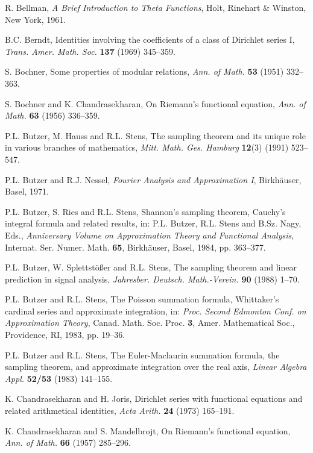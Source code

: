 \documentclass[11pt]{article}
\theoremstyle{plain}
\begin{document}
\begin{thebibliography}{99}

R. Bellman, \textit{A Brief Introduction to Theta Functions}, Holt, Rinehart \& Winston, New York, 1961.

B.C. Berndt, Identities involving the coefficients of a class of Dirichlet series I, \textit{Trans. Amer. Math. Soc.} \textbf{137} (1969) 345--359.

S. Bochner, Some properties of modular relations, \textit{Ann. of Math.} \textbf{53} (1951) 332--363.

S. Bochner and K. Chandrasekharan, On Riemann's functional equation, \textit{Ann. of Math.} \textbf{63} (1956) 336--359.

P.L. Butzer, M. Hauss and R.L. Stens, The sampling theorem and its unique role in various branches of mathematics, \textit{Mitt. Math. Ges. Hamburg} \textbf{12}(3) (1991) 523--547.

P.L. Butzer and R.J. Nessel, \textit{Fourier Analysis and Approximation I}, Birkhäuser, Basel, 1971.

P.L. Butzer, S. Ries and R.L. Stens, Shannon's sampling theorem, Cauchy's integral formula and related results, in: P.L. Butzer, R.L. Stens and B.Sz. Nagy, Eds., \textit{Anniversary Volume on Approximation Theory and Functional Analysis}, Internat. Ser. Numer. Math. \textbf{65}, Birkhäuser, Basel, 1984, pp. 363--377.

P.L. Butzer, W. Splettstößer and R.L. Stens, The sampling theorem and linear prediction in signal analysis, \textit{Jahresber. Deutsch. Math.-Verein.} \textbf{90} (1988) 1--70.

P.L. Butzer and R.L. Stens, The Poisson summation formula, Whittaker's cardinal series and approximate integration, in: \textit{Proc. Second Edmonton Conf. on Approximation Theory}, Canad. Math. Soc. Proc. \textbf{3}, Amer. Mathematical Soc., Providence, RI, 1983, pp. 19--36.

P.L. Butzer and R.L. Stens, The Euler-Maclaurin summation formula, the sampling theorem, and approximate integration over the real axis, \textit{Linear Algebra Appl.} \textbf{52/53} (1983) 141--155.

K. Chandrasekharan and H. Joris, Dirichlet series with functional equations and related arithmetical identities, \textit{Acta Arith.} \textbf{24} (1973) 165--191.

K. Chandrasekharan and S. Mandelbrojt, On Riemann's functional equation, \textit{Ann. of Math.} \textbf{66} (1957) 285--296.


\end{thebibliography}
\end{document}
